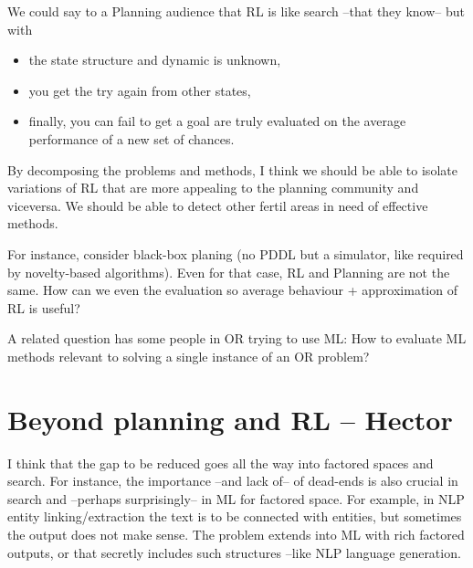 \documentclass[10pt]{article}
\begin{document}
We could say to a Planning audience that RL is like search –that they know– but with
\begin{itemize}
\item the state structure and dynamic is unknown, 
\item you get the try again from other states,
\item finally, you can fail to get a goal are truly evaluated on the average performance of a new set of chances.
\end{itemize}

By decomposing the problems and methods, I think we should be able to isolate
variations of RL that are more appealing to the planning community and viceversa.
We should be able to detect other fertil areas in need of effective methods.

For instance, consider black-box planing (no PDDL but a simulator, like required by novelty-based algorithms).
Even for that case, RL and Planning are not the same.
How can we even the evaluation so average behaviour + approximation of RL is useful?

A related question has some people in OR trying to use ML:
How to evaluate ML methods relevant to solving a single instance of an OR problem?

\section*{Beyond planning and RL – Hector}

I think  that the gap to be reduced goes all the way into factored spaces and search. For instance, the importance –and lack of– of dead-ends is also crucial in search and –perhaps surprisingly– in ML for factored space. For example, in NLP entity linking/extraction the text is to be connected with entities, but sometimes the output does not make sense. The problem extends into ML with rich factored outputs, or that secretly includes such structures –like NLP language generation. 
\end{document}
